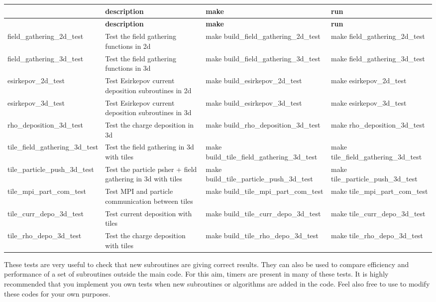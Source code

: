 \tabulinesep=1mm
\begin{longtabu} spread 0pt [c]{*4{|X[-1]}|}
\hline
{}&{\bf description }&{\bf make }&{\bf run  }\\
\endfirsthead
\hline
\endfoot
\hline
{}&{\bf description }&{\bf make }&{\bf run  }\\
\endhead
field\+\_\+gathering\+\_\+2d\+\_\+test &Test the field gathering functions in 2d &make build\+\_\+field\+\_\+gathering\+\_\+2d\+\_\+test &make field\+\_\+gathering\+\_\+2d\+\_\+test \\
field\+\_\+gathering\+\_\+3d\+\_\+test &Test the field gathering functions in 3d &make build\+\_\+field\+\_\+gathering\+\_\+3d\+\_\+test &make field\+\_\+gathering\+\_\+3d\+\_\+test \\
esirkepov\+\_\+2d\+\_\+test &Test Esirkepov current deposition subroutines in 2d &make build\+\_\+esirkepov\+\_\+2d\+\_\+test &make esirkepov\+\_\+2d\+\_\+test \\
esirkepov\+\_\+3d\+\_\+test &Test Esirkepov current deposition subroutines in 3d &make build\+\_\+esirkepov\+\_\+3d\+\_\+test &make esirkepov\+\_\+3d\+\_\+test \\
rho\+\_\+deposition\+\_\+3d\+\_\+test &Test the charge deposition in 3d &make build\+\_\+rho\+\_\+deposition\+\_\+3d\+\_\+test &make rho\+\_\+deposition\+\_\+3d\+\_\+test \\
tile\+\_\+field\+\_\+gathering\+\_\+3d\+\_\+test &Test the field gathering in 3d with tiles &make build\+\_\+tile\+\_\+field\+\_\+gathering\+\_\+3d\+\_\+test &make tile\+\_\+field\+\_\+gathering\+\_\+3d\+\_\+test \\
tile\+\_\+particle\+\_\+push\+\_\+3d\+\_\+test &Test the particle psher + field gathering in 3d with tiles &make build\+\_\+tile\+\_\+particle\+\_\+push\+\_\+3d\+\_\+test &make tile\+\_\+particle\+\_\+push\+\_\+3d\+\_\+test \\
tile\+\_\+mpi\+\_\+part\+\_\+com\+\_\+test &Test M\+PI and particle communication between tiles &make build\+\_\+tile\+\_\+mpi\+\_\+part\+\_\+com\+\_\+test &make tile\+\_\+mpi\+\_\+part\+\_\+com\+\_\+test \\
tile\+\_\+curr\+\_\+depo\+\_\+3d\+\_\+test &Test current deposition with tiles &make build\+\_\+tile\+\_\+curr\+\_\+depo\+\_\+3d\+\_\+test &make tile\+\_\+curr\+\_\+depo\+\_\+3d\+\_\+test \\
tile\+\_\+rho\+\_\+depo\+\_\+3d\+\_\+test &Test the charge deposition with tiles &make build\+\_\+tile\+\_\+rho\+\_\+depo\+\_\+3d\+\_\+test &make tile\+\_\+rho\+\_\+depo\+\_\+3d\+\_\+test \\
\end{longtabu}
These tests are very useful to check that new subroutines are giving correct results. They can also be used to compare efficiency and performance of a set of subroutines outside the main code. For this aim, timers are present in many of these tests. It is highly recommended that you implement you own tests when new subroutines or algorithms are added in the code. Feel also free to use to modify these codes for your own purposes. 